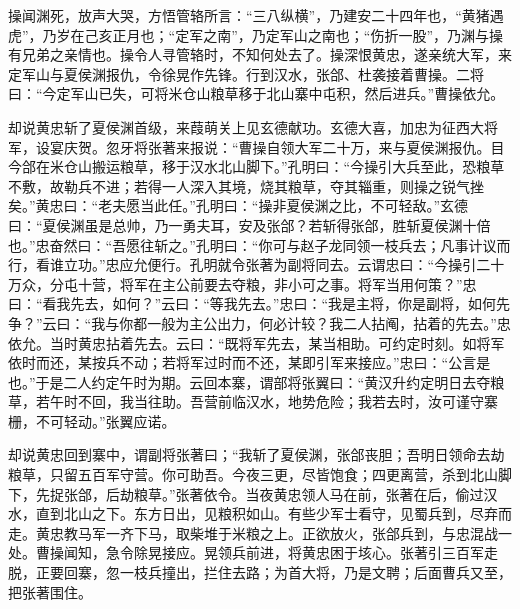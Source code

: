 操闻渊死，放声大哭，方悟管辂所言：“三八纵横”，乃建安二十四年也，“黄猪遇虎”，乃岁在己亥正月也；“定军之南”，乃定军山之南也；“伤折一股”，乃渊与操有兄弟之亲情也。操令人寻管辂时，不知何处去了。操深恨黄忠，遂亲统大军，来定军山与夏侯渊报仇，令徐晃作先锋。行到汉水，张郃、杜袭接着曹操。二将曰：“今定军山已失，可将米仓山粮草移于北山寨中屯积，然后进兵。”曹操依允。

却说黄忠斩了夏侯渊首级，来葭萌关上见玄德献功。玄德大喜，加忠为征西大将军，设宴庆贺。忽牙将张著来报说：“曹操自领大军二十万，来与夏侯渊报仇。目今郃在米仓山搬运粮草，移于汉水北山脚下。”孔明曰：“今操引大兵至此，恐粮草不敷，故勒兵不进；若得一人深入其境，烧其粮草，夺其辎重，则操之锐气挫矣。”黄忠曰：“老夫愿当此任。”孔明曰：“操非夏侯渊之比，不可轻敌。”玄德曰：“夏侯渊虽是总帅，乃一勇夫耳，安及张郃？若斩得张郃，胜斩夏侯渊十倍也。”忠奋然曰：“吾愿往斩之。”孔明曰：“你可与赵子龙同领一枝兵去；凡事计议而行，看谁立功。”忠应允便行。孔明就令张著为副将同去。云谓忠曰：“今操引二十万众，分屯十营，将军在主公前要去夺粮，非小可之事。将军当用何策？”忠曰：“看我先去，如何？”云曰：“等我先去。”忠曰：“我是主将，你是副将，如何先争？”云曰：“我与你都一般为主公出力，何必计较？我二人拈阄，拈着的先去。”忠依允。当时黄忠拈着先去。云曰：“既将军先去，某当相助。可约定时刻。如将军依时而还，某按兵不动；若将军过时而不还，某即引军来接应。”忠曰：“公言是也。”于是二人约定午时为期。云回本寨，谓部将张翼曰：“黄汉升约定明日去夺粮草，若午时不回，我当往助。吾营前临汉水，地势危险；我若去时，汝可谨守寨栅，不可轻动。”张翼应诺。

却说黄忠回到寨中，谓副将张著曰；“我斩了夏侯渊，张郃丧胆；吾明日领命去劫粮草，只留五百军守营。你可助吾。今夜三更，尽皆饱食；四更离营，杀到北山脚下，先捉张郃，后劫粮草。”张著依令。当夜黄忠领人马在前，张著在后，偷过汉水，直到北山之下。东方日出，见粮积如山。有些少军士看守，见蜀兵到，尽弃而走。黄忠教马军一齐下马，取柴堆于米粮之上。正欲放火，张郃兵到，与忠混战一处。曹操闻知，急令除晃接应。晃领兵前进，将黄忠困于垓心。张著引三百军走脱，正要回寨，忽一枝兵撞出，拦住去路；为首大将，乃是文聘；后面曹兵又至，把张著围住。

